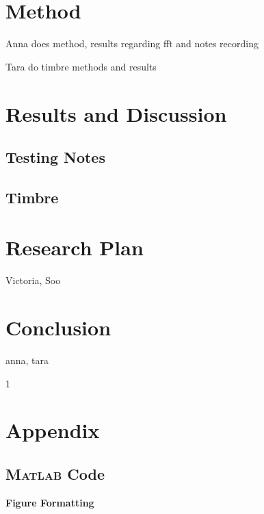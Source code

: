 \documentclass{article}
\begin{document}
\section{Method}
Anna does method, results regarding fft and notes recording

Tara do timbre methods and results

\section{Results and Discussion}
\subsection{Testing Notes}
\subsection{Timbre}
\newpage


\section{Research Plan}
Victoria, Soo

\section{Conclusion}
anna, tara

\newpage
{}
\setcounter{page}1



\newpage
\section{Appendix}
\subsection{\textsc{Matlab} Code}

\noindent\textbf{Figure Formatting}


\end{document}
